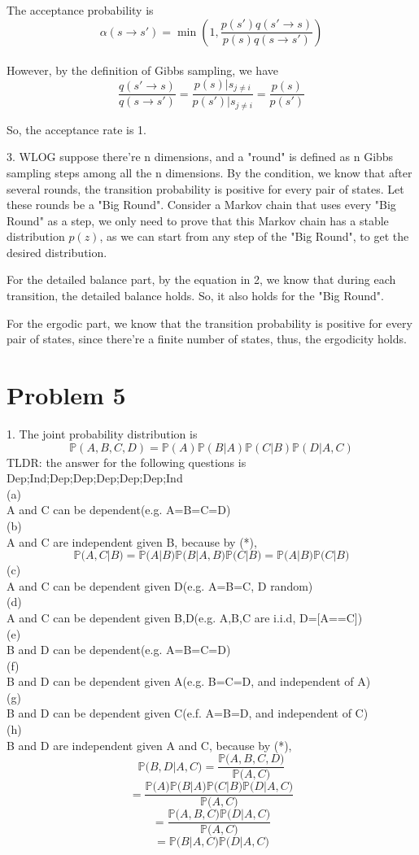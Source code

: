 \documentclass[a4 paper,12pt]{article}
\begin{document}
The acceptance probability is
\[ \alpha(s\to s') = \min(1, \frac{p(s')q(s'\to s)}{p(s)q(s \to s')})\]\\
However, by the definition of Gibbs sampling, we have
\[ \frac{q(s'\to s)}{q(s\to s')} = \frac{p(s)|s_{j\neq i}}{p(s')|s_{j\neq i}} = \frac{p(s)}{p(s')} \]

So, the acceptance rate is 1.

3.
WLOG suppose there're n dimensions, and a "round"
is defined as n Gibbs sampling steps among all the 
n dimensions. By the condition, we know that after 
several rounds, the transition probability is positive
for every pair of states. Let these rounds be a "Big Round".
Consider a Markov chain that uses every "Big Round"
as a step, we only need to prove that this
Markov chain has a stable distribution $p(z)$,
as we can start from any step of the "Big Round",
to get the desired distribution.

For the detailed balance part, by the equation  
in 2, we know that during each transition, the detailed balance
holds. So, it also holds for the "Big Round".

For the ergodic part, we know that the transition probability
is positive for every pair of states, 
since there're a finite number of states, thus, the ergodicity holds.

\newcommand*{\pr}[1]{\mathbb{P}{#1}}
\section*{Problem 5}
1.
The joint probability distribution is 
\[ \mathbb{P}(A,B,C,D) = \mathbb{P}(A) \mathbb{P}(B|A) \mathbb{P}(C|B) \mathbb{P}(D|A,C)\tag{*}\]
TLDR: the answer for the following questions is Dep;Ind;Dep;Dep;Dep;Dep;Dep;Ind\\
(a)\\
A and C can be dependent(e.g. A=B=C=D)\\
(b)\\
A and C are independent given B, because by (*),
\[\pr(A,C|B)=\pr(A|B)\pr(B|A,B)\pr(C|B)=\pr(A|B)\pr(C|B)\]
(c)\\
A and C can be dependent given D(e.g. A=B=C, D random)\\
(d)\\
A and C can be dependent given B,D(e.g. A,B,C are i.i.d, D=[A==C])\\
(e)\\
B and D can be dependent(e.g. A=B=C=D)\\
(f)\\
B and D can be dependent given A(e.g. B=C=D, and independent of A)\\
(g)\\
B and D can be dependent given C(e.f. A=B=D, and independent of C)\\
(h)\\
B and D are independent given A and C, because by (*),
\[\pr(B,D|A,C) = \frac{\pr(A,B,C,D)}{\pr(A,C)}\]
\[=\frac{\pr(A)\pr(B|A)\pr(C|B)\pr(D|A,C)}{\pr(A,C)}\]
\[=\frac{\pr(A,B,C)\pr(D|A,C)}{\pr(A,C)}\]
\[=\pr(B|A,C)\pr(D|A,C)\]
\end{document}
